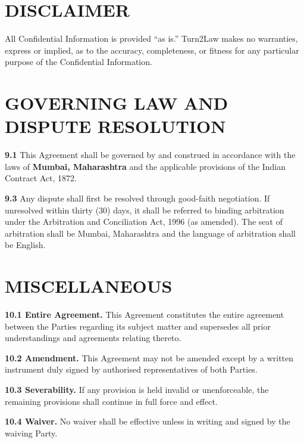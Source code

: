 \documentclass[10pt]{article}
\begin{document}
\section{DISCLAIMER}

All Confidential Information is provided ``as is.'' Turn2Law makes no warranties, express or implied, as to the accuracy, completeness, or fitness for any particular purpose of the Confidential Information.

\section{GOVERNING LAW AND DISPUTE RESOLUTION}

\textbf{9.1} This Agreement shall be governed by and construed in accordance with the laws of \textbf{Mumbai, Maharashtra} and the applicable provisions of the Indian Contract Act, 1872.


\textbf{9.3} Any dispute shall first be resolved through good-faith negotiation. If unresolved within thirty (30) days, it shall be referred to binding arbitration under the Arbitration and Conciliation Act, 1996 (as amended). The seat of arbitration shall be Mumbai, Maharashtra and the language of arbitration shall be English.

\section{MISCELLANEOUS}

\textbf{10.1 Entire Agreement.} This Agreement constitutes the entire agreement between the Parties regarding its subject matter and supersedes all prior understandings and agreements relating thereto.

\textbf{10.2 Amendment.} This Agreement may not be amended except by a written instrument duly signed by authorised representatives of both Parties.

\textbf{10.3 Severability.} If any provision is held invalid or unenforceable, the remaining provisions shall continue in full force and effect.

\textbf{10.4 Waiver.} No waiver shall be effective unless in writing and signed by the waiving Party.
\end{document}
